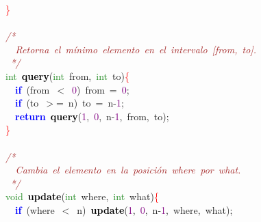 {{\mbox{}\ \ \textcolor{Red}{\}} \\
\mbox{} \\
\mbox{}\ \ \textit{\textcolor{Brown}{/*}} \\
\mbox{}\textit{\textcolor{Brown}{\ \ \ \ Retorna\ el\ mínimo\ elemento\ en\ el\ intervalo\ [from,\ to].}} \\
\mbox{}\textit{\textcolor{Brown}{\ \ \ */}} \\
\mbox{}\ \ \textcolor{ForestGreen}{int}\ \textbf{\textcolor{Black}{query}}\textcolor{BrickRed}{(}\textcolor{ForestGreen}{int}\ from\textcolor{BrickRed}{,}\ \textcolor{ForestGreen}{int}\ to\textcolor{BrickRed}{)}\textcolor{Red}{\{} \\
\mbox{}\ \ \ \ \textbf{\textcolor{Blue}{if}}\ \textcolor{BrickRed}{(}from\ \textcolor{BrickRed}{$<$}\ \textcolor{Purple}{0}\textcolor{BrickRed}{)}\ from\ \textcolor{BrickRed}{=}\ \textcolor{Purple}{0}\textcolor{BrickRed}{;} \\
\mbox{}\ \ \ \ \textbf{\textcolor{Blue}{if}}\ \textcolor{BrickRed}{(}to\ \textcolor{BrickRed}{$>$=}\ n\textcolor{BrickRed}{)}\ to\ \textcolor{BrickRed}{=}\ n\textcolor{BrickRed}{-}\textcolor{Purple}{1}\textcolor{BrickRed}{;} \\
\mbox{}\ \ \ \ \textbf{\textcolor{Blue}{return}}\ \textbf{\textcolor{Black}{query}}\textcolor{BrickRed}{(}\textcolor{Purple}{1}\textcolor{BrickRed}{,}\ \textcolor{Purple}{0}\textcolor{BrickRed}{,}\ n\textcolor{BrickRed}{-}\textcolor{Purple}{1}\textcolor{BrickRed}{,}\ from\textcolor{BrickRed}{,}\ to\textcolor{BrickRed}{);} \\
\mbox{}\ \ \textcolor{Red}{\}} \\
\mbox{} \\
\mbox{}\ \ \textit{\textcolor{Brown}{/*}} \\
\mbox{}\textit{\textcolor{Brown}{\ \ \ \ Cambia\ el\ elemento\ en\ la\ posición\ where\ por\ what.}} \\
\mbox{}\textit{\textcolor{Brown}{\ \ \ */}} \\
\mbox{}\ \ \textcolor{ForestGreen}{void}\ \textbf{\textcolor{Black}{update}}\textcolor{BrickRed}{(}\textcolor{ForestGreen}{int}\ where\textcolor{BrickRed}{,}\ \textcolor{ForestGreen}{int}\ what\textcolor{BrickRed}{)}\textcolor{Red}{\{} \\
\mbox{}\ \ \ \ \textbf{\textcolor{Blue}{if}}\ \textcolor{BrickRed}{(}where\ \textcolor{BrickRed}{$<$}\ n\textcolor{BrickRed}{)}\ \textbf{\textcolor{Black}{update}}\textcolor{BrickRed}{(}\textcolor{Purple}{1}\textcolor{BrickRed}{,}\ \textcolor{Purple}{0}\textcolor{BrickRed}{,}\ n\textcolor{BrickRed}{-}\textcolor{Purple}{1}\textcolor{BrickRed}{,}\ where\textcolor{BrickRed}{,}\ what\textcolor{BrickRed}{);} \\
}}
